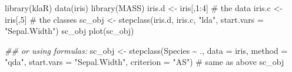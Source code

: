 \documentclass[
  letterpaper,
]{krantz}
\makeatletter
\newenvironment{Shaded}{\begin{snugshade}}{\end{snugshade}}
\newcommand{\AttributeTok}[1]{\textcolor[rgb]{0.40,0.45,0.13}{#1}}
\newcommand{\CommentTok}[1]{\textcolor[rgb]{0.37,0.37,0.37}{#1}}
\newcommand{\DecValTok}[1]{\textcolor[rgb]{0.68,0.00,0.00}{#1}}
\newcommand{\DocumentationTok}[1]{\textcolor[rgb]{0.37,0.37,0.37}{\textit{#1}}}
\newcommand{\FunctionTok}[1]{\textcolor[rgb]{0.28,0.35,0.67}{#1}}
\newcommand{\NormalTok}[1]{\textcolor[rgb]{0.00,0.23,0.31}{#1}}
\newcommand{\OtherTok}[1]{\textcolor[rgb]{0.00,0.23,0.31}{#1}}
\newcommand{\SpecialCharTok}[1]{\textcolor[rgb]{0.37,0.37,0.37}{#1}}
\newcommand{\StringTok}[1]{\textcolor[rgb]{0.13,0.47,0.30}{#1}}
\newenvironment{kframe}{%
\medskip{}
\setlength{\fboxsep}{.8em}
 \def\at@end@of@kframe{}%
 \ifinner\ifhmode%
  \def\at@end@of@kframe{\end{minipage}}%
  \begin{minipage}{\columnwidth}%
 \fi\fi%
 \def\FrameCommand##1{\hskip\@totalleftmargin \hskip-\fboxsep
 \colorbox{shadecolor}{##1}\hskip-\fboxsep
     \hskip-\linewidth \hskip-\@totalleftmargin \hskip\columnwidth}%
 \MakeFramed {\advance\hsize-\width
   \@totalleftmargin\z@ \linewidth\hsize
   \@setminipage}}%
 {\par\unskip\endMakeFramed%
 \at@end@of@kframe}
\renewenvironment{Shaded}{\begin{kframe}}{\end{kframe}}
\makeatother
\begin{document}
\begin{Shaded}
\begin{Highlighting}[]
\FunctionTok{library}\NormalTok{(klaR)}
\FunctionTok{data}\NormalTok{(iris)}
\FunctionTok{library}\NormalTok{(MASS)}
\NormalTok{iris.d }\OtherTok{\textless{}{-}}\NormalTok{ iris[,}\DecValTok{1}\SpecialCharTok{:}\DecValTok{4}\NormalTok{]  }\CommentTok{\# the data    }
\NormalTok{iris.c }\OtherTok{\textless{}{-}}\NormalTok{ iris[,}\DecValTok{5}\NormalTok{]    }\CommentTok{\# the classes }
\NormalTok{sc\_obj }\OtherTok{\textless{}{-}} \FunctionTok{stepclass}\NormalTok{(iris.d, iris.c, }\StringTok{"lda"}\NormalTok{, }\AttributeTok{start.vars =} \StringTok{"Sepal.Width"}\NormalTok{)}
\NormalTok{sc\_obj}
\FunctionTok{plot}\NormalTok{(sc\_obj)}

\DocumentationTok{\#\# or using formulas:}
\NormalTok{sc\_obj }\OtherTok{\textless{}{-}} \FunctionTok{stepclass}\NormalTok{(Species }\SpecialCharTok{\textasciitilde{}}\NormalTok{ ., }\AttributeTok{data =}\NormalTok{ iris, }\AttributeTok{method =} \StringTok{"qda"}\NormalTok{, }
    \AttributeTok{start.vars =} \StringTok{"Sepal.Width"}\NormalTok{, }\AttributeTok{criterion =} \StringTok{"AS"}\NormalTok{)  }\CommentTok{\# same as above }
\NormalTok{sc\_obj}
\end{Highlighting}
\end{Shaded}
\end{document}

